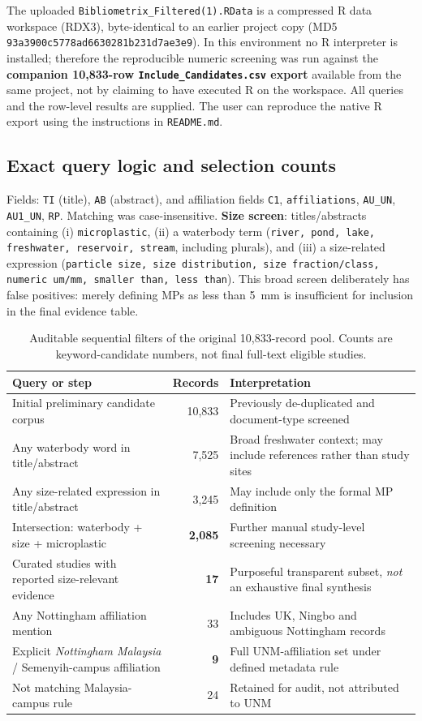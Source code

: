 \documentclass[10pt,a4paper]{article}
\begin{document}
The uploaded \texttt{Bibliometrix\_Filtered(1).RData} is a compressed R data workspace (RDX3), byte-identical to an earlier project copy (MD5 \texttt{93a3900c5778ad6630281b231d7ae3e9}). In this environment no R interpreter is installed; therefore the reproducible numeric screening was run against the \textbf{companion 10,833-row \texttt{Include\_Candidates.csv} export} available from the same project, not by claiming to have executed R on the workspace. All queries and the row-level results are supplied. The user can reproduce the native R export using the instructions in \texttt{README.md}.

\subsection{Exact query logic and selection counts}
Fields: \texttt{TI} (title), \texttt{AB} (abstract), and affiliation fields \texttt{C1}, \texttt{affiliations}, \texttt{AU\_UN}, \texttt{AU1\_UN}, \texttt{RP}. Matching was case-insensitive. \textbf{Size screen}: titles/abstracts containing (i) \texttt{microplastic}, (ii) a waterbody term (\texttt{river, pond, lake, freshwater, reservoir, stream}, including plurals), and (iii) a size-related expression (\texttt{particle size, size distribution, size fraction/class, numeric um/mm, smaller than, less than}). This broad screen deliberately has false positives: merely defining MPs as less than 5~mm is insufficient for inclusion in the final evidence table.

\begin{table}[H]\centering\small\caption{Auditable sequential filters of the original 10,833-record pool. Counts are keyword-candidate numbers, not final full-text eligible studies.}\label{tab:screen}
\begin{tabularx}{\linewidth}{@{}XrX@{}}\toprule
Query or step & Records & Interpretation\\\midrule
Initial preliminary candidate corpus & 10,833 & Previously de-duplicated and document-type screened\\
Any waterbody word in title/abstract & 7,525 & Broad freshwater context; may include references rather than study sites\\
Any size-related expression in title/abstract & 3,245 & May include only the formal MP definition\\
Intersection: waterbody + size + microplastic & \textbf{2,085} & Further manual study-level screening necessary\\
Curated studies with reported size-relevant evidence & \textbf{17} & Purposeful transparent subset, \emph{not} an exhaustive final synthesis\\\midrule
Any Nottingham affiliation mention & 33 & Includes UK, Ningbo and ambiguous Nottingham records\\
Explicit \emph{Nottingham Malaysia} / Semenyih-campus affiliation & \textbf{9} & Full UNM-affiliation set under defined metadata rule\\
Not matching Malaysia-campus rule & 24 & Retained for audit, not attributed to UNM\\\bottomrule
\end{tabularx}\end{table}
\end{document}
